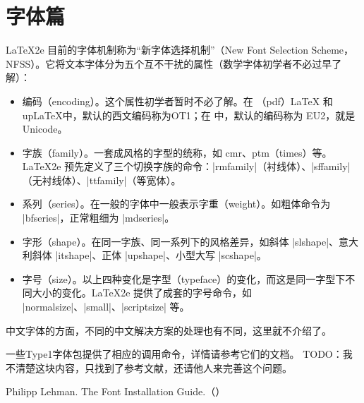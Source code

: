 
\section{字体篇}


\LaTeX{2e} 目前的字体机制称为“新字体选择机制”（New Font Selection
Scheme，NFSS）。它将文本字体分为五个互不干扰的属性（数学字体初学者不必过早了解）：
\begin{itemize}
  \item 编码（encoding）。这个属性初学者暂时不必了解。在 （pdf）\LaTeX{} 和 up\LaTeX 中，默认的西文编码称为OT1；在 \XeLaTeX 中，默认的编码称为 EU2，就是 Unicode。
  \item 字族（family）。一套成风格的字型的统称，如 cmr、ptm（times）等。\LaTeX2e{} 预先定义了三个切换字族的命令：|rmfamily|（衬线体）、|sffamily|（无衬线体）、|ttfamily|（等宽体）。
  \item 系列（series）。在一般的字体中一般表示字重（weight）。如粗体命令为 |bfseries|，正常粗细为 |mdseries|。
  \item 字形（shape）。在同一字族、同一系列下的风格差异，如斜体 |slshape|、意大利斜体 |itshape|、正体 |upshape|、小型大写 |scshape|。
  \item 字号（size）。以上四种变化是字型（typeface）的变化，而这是同一字型下不同大小的变化。\LaTeX2e{} 提供了成套的字号命令，如 |normalsize|、|small|、|scriptsize| 等。
\end{itemize}

中文字体的方面，不同的中文解决方案的处理也有不同，这里就不介绍了。










一些Type1字体包提供了相应的调用命令，详情请参考它们的文档。
TODO：我不清楚这块内容，只找到了参考文献，还请他人来完善这个问题。
\begin{reference}
  \item Philipp Lehman. The Font Installation Guide.（）
\end{reference}




